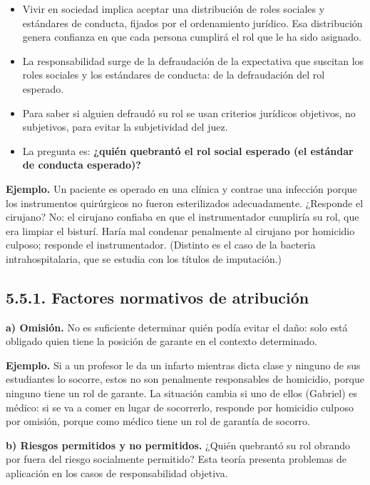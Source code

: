 \begin{itemize}
\item Vivir en sociedad implica aceptar una distribución de roles sociales y estándares de conducta, fijados por el ordenamiento jurídico. Esa distribución genera confianza en que cada persona cumplirá el rol que le ha sido asignado.
\item La responsabilidad surge de la defraudación de la expectativa que suscitan los roles sociales y los estándares de conducta: de la defraudación del rol esperado.
\item Para saber si alguien defraudó su rol se usan criterios jurídicos objetivos, no subjetivos, para evitar la subjetividad del juez.
\item La pregunta es: \textbf{¿quién quebrantó el rol social esperado (el estándar de conducta esperado)?}
\end{itemize}
\begin{ejemplo}
\textcolor[HTML]{4F6228}{\textbf{Ejemplo. }}Un paciente es operado en una clínica y contrae una infección porque los instrumentos quirúrgicos no fueron esterilizados adecuadamente. ¿Responde el cirujano? No: el cirujano confiaba en que el instrumentador cumpliría su rol, que era limpiar el bisturí. Haría mal condenar penalmente al cirujano por homicidio culposo; responde el instrumentador. (Distinto es el caso de la bacteria intrahospitalaria, que se estudia con los títulos de imputación.)
\end{ejemplo}
\subsection{5.5.1. Factores normativos de atribución}
\textbf{a) Omisión.} No es suficiente determinar quién podía evitar el daño: solo está obligado quien tiene la posición de garante en el contexto determinado.

\begin{ejemplo}
\textcolor[HTML]{4F6228}{\textbf{Ejemplo. }}Si a un profesor le da un infarto mientras dicta clase y ninguno de sus estudiantes lo socorre, estos no son penalmente responsables de homicidio, porque ninguno tiene un rol de garante. La situación cambia si uno de ellos (Gabriel) es médico: si se va a comer en lugar de socorrerlo, responde por homicidio culposo por omisión, porque como médico tiene un rol de garantía de socorro.
\end{ejemplo}
\textbf{b) Riesgos permitidos y no permitidos.} ¿Quién quebrantó su rol obrando por fuera del riesgo socialmente permitido? Esta teoría presenta problemas de aplicación en los casos de responsabilidad objetiva.

